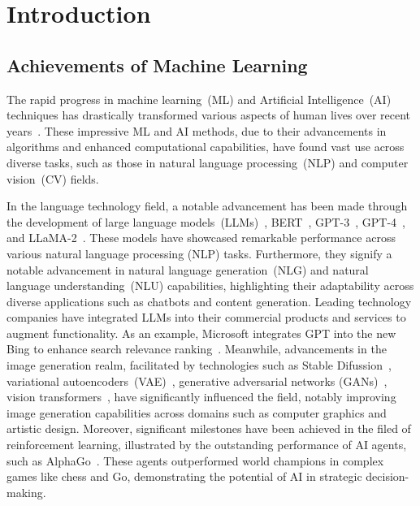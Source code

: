 \chapter{Introduction}\label{chap:intro}

\section{Achievements of Machine Learning}

The rapid progress in machine learning~(ML) and Artificial Intelligence~(AI) techniques
has drastically transformed various aspects of human lives over recent years~\cite{bengio-nature15,taward18}.
%
These impressive ML and AI methods, due to their advancements in algorithms
and enhanced computational capabilities,
have found vast use across
diverse tasks, such as those in natural language processing~(NLP) and computer vision~(CV) fields.



In the language technology field, a notable advancement has been made through the development
of large language models~(LLMs)~\cite{llm-tist23,gptedu-lid23,transformer-17}, BERT~\cite{dclt-bert19}, GPT-3~\cite{gpt-3-neurips20}, GPT-4~\cite{gpt-4-corr23}, and LLaMA-2~\cite{llama-2-corr23}.
%
These models have showcased remarkable performance across various natural language processing (NLP) tasks.
%
Furthermore, they signify a notable advancement in natural language generation~(NLG) 
and natural language understanding~(NLU) capabilities, 
highlighting their adaptability across diverse applications such as chatbots and content generation.
%
Leading technology companies have integrated LLMs into their commercial products 
and services to augment functionality.
%
As an example, Microsoft integrates GPT into the new Bing to enhance search relevance ranking~\cite{bing-17}.
%
Meanwhile, advancements in the image generation realm, facilitated by technologies 
such as Stable Difussion~\cite{rbleo-cvpr22}, variational autoencoders~(VAE)~\cite{kw-corr13}, generative adversarial networks (GANs)~\cite{gan-corr14},
vision transformers~\cite{vtransformer-21}, have significantly influenced the field,
notably improving image generation capabilities across domains such as computer graphics and artistic design.
%
Moreover, significant milestones have been achieved in the filed of reinforcement learning, 
illustrated by the outstanding performance of AI agents, such as AlphaGo~\cite{rl-nature15,rlchess-science18,rlgo-nature17}.
%
These agents outperformed world champions in complex games like chess and Go,
demonstrating the potential of AI in strategic decision-making.

